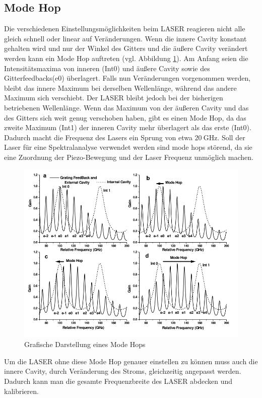 \subsection{Mode Hop}
Die verschiedenen Einstellungsmöglichkeiten beim LASER reagieren nicht alle gleich schnell oder linear auf Veränderungen.
Wenn die innere Cavity konstant gehalten wird und nur der Winkel des Gitters und die äußere Cavity verändert werden 
kann ein Mode Hop auftreten (vgl. Abbildung \ref{fig:Hop}).
Am Anfang seien die Intensitätsmaxima von inneren (Int0) und äußere Cavity sowie des Gitterfeedbacks(e0) überlagert.
Falls nun Veränderungen vorgenommen werden, 
bleibt das innere Maximum bei derselben Wellenlänge, während das andere Maximum sich verschiebt. 
Der LASER bleibt jedoch bei der bisherigen betriebenen Wellenlänge. 
Wenn das Maximum von der äußeren Cavity und das des Gitters sich weit genug verschoben haben, gibt es einen Mode Hop, 
da das zweite Maximum (Int1) der inneren Cavity mehr überlagert als das erste (Int0).
Dadurch macht die Frequenz des Lasers ein Sprung von etwa $\qty{20}{\giga\hertz}$.
Soll der Laser für eine Spektralanalyse verwendet werden sind mode hops störend, 
da sie eine Zuordnung der Piezo-Bewegung und der Laser Frequenz unmöglich machen.

\begin{figure}[H]
    \centering
    \includegraphics[width=\textwidth]{Bilder/Mode_Hop.png} 
    \caption{Grafische Darstellung eines Mode Hops \cite{man:v60}}
    \label{fig:Hop}
\end{figure}

Um die LASER ohne diese Mode Hop genauer einstellen zu können muss auch die innere Cavity, durch Veränderung des Stroms, gleichzeitig angepasst werden.
Dadurch kann man die gesamte Frequenzbreite des LASER abdecken und kalibrieren. 


